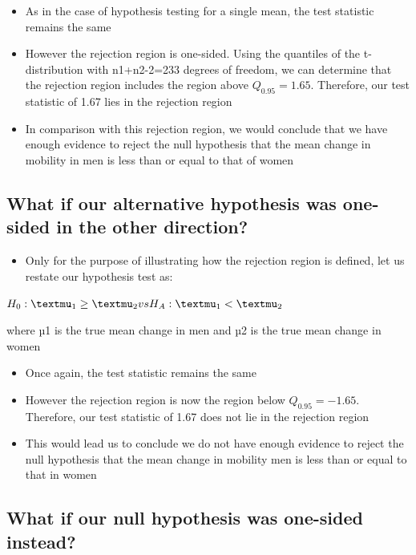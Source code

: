 \documentclass[
]{book}
\providecommand{\tightlist}{%
  \setlength{\itemsep}{0pt}\setlength{\parskip}{0pt}}
\begin{document}
\begin{itemize}
\tightlist
\item
  As in the case of hypothesis testing for a single mean, the test statistic remains the same
\item
  However the rejection region is one-sided. Using the quantiles of the t-distribution with n1+n2-2=233 degrees of freedom, we can determine that the rejection region includes the region above \(Q_{0.95} = 1.65\). Therefore, our test statistic of 1.67 lies in the rejection region
\item
  In comparison with this rejection region, we would conclude that we have enough evidence to reject the null hypothesis that the mean change in mobility in men is less than or equal to that of women
\end{itemize}

\hypertarget{what-if-our-alternative-hypothesis-was-one-sided-in-the-other-direction}{%
\subsection{What if our alternative hypothesis was one-sided in the other direction?}\label{what-if-our-alternative-hypothesis-was-one-sided-in-the-other-direction}}

\begin{itemize}
\tightlist
\item
  Only for the purpose of illustrating how the rejection region is defined, let us restate our hypothesis test as:
\end{itemize}

\(H_0: µ_1 \geq µ_2 \space\space\space\space\space vs \space\space\space\space\space H_A: µ_1 < µ_2\)

where µ1 is the true mean change in men and µ2 is the true mean change in women

\begin{itemize}
\tightlist
\item
  Once again, the test statistic remains the same
\item
  However the rejection region is now the region below \(Q_{0.95} = -1.65\). Therefore, our test statistic of 1.67 does not lie in the rejection region
\item
  This would lead us to conclude we do not have enough evidence to reject the null hypothesis that the mean change in mobility men is less than or equal to that in women
\end{itemize}

\hypertarget{what-if-our-null-hypothesis-was-one-sided-instead}{%
\subsection{What if our null hypothesis was one-sided instead?}\label{what-if-our-null-hypothesis-was-one-sided-instead}}
\end{document}

